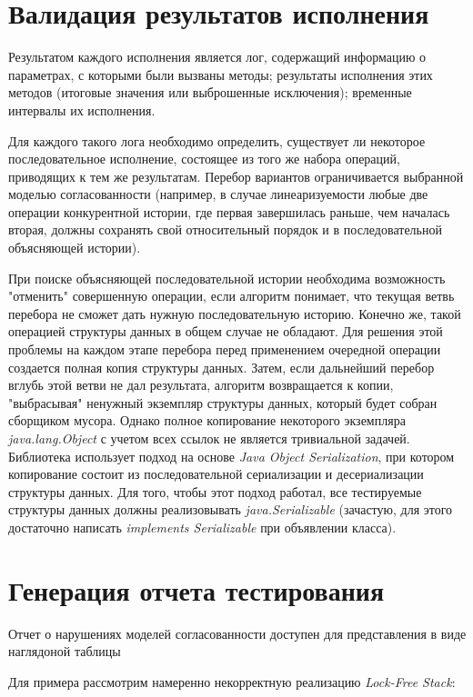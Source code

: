\documentclass[14pt, openany]{book}
\begin{document}
\section{Валидация результатов исполнения}
Результатом каждого исполнения является лог, содержащий информацию о параметрах, с которыми были вызваны методы; результаты исполнения этих методов (итоговые значения или выброшенные исключения); временные интервалы их исполнения. \par
Для каждого такого лога необходимо определить, существует ли некоторое последовательное исполнение, состоящее из того же набора операций, приводящих к тем же результатам. Перебор вариантов ограничивается выбранной моделью согласованности (например, в случае линеаризуемости любые две операции конкурентной истории, где первая завершилась раньше, чем началась вторая, должны сохранять свой относительный порядок и в последовательной объясняющей истории). \par
При поиске объясняющей последовательной истории необходима возможность "отменить" совершенную операции, если алгоритм понимает, что текущая ветвь перебора не сможет дать нужную последовательную историю. Конечно же, такой операцией структуры данных в общем случае не обладают. Для решения этой проблемы на каждом этапе перебора перед применением очередной операции создается полная копия структуры данных. Затем, если дальнейший перебор вглубь этой ветви не дал результата, алгоритм возвращается к копии, "выбрасывая" ненужный экземпляр структуры данных, который будет собран сборщиком мусора. Однако полное копирование некоторого экземпляра \textit{java.lang.Object} с учетом всех ссылок не является тривиальной задачей. Библиотека использует подход на основе \textit{Java Object Serialization}, при котором копирование состоит из последовательной сериализации и десериализации структуры данных. Для того, чтобы этот подход работал, все тестируемые структуры данных должны реализовывать \textit{java.Serializable} (зачастую, для этого достаточно написать \textit{implements Serializable} при объявлении класса).

\section{Генерация отчета тестирования}
Отчет о нарушениях моделей согласованности доступен для представления в виде наглядоной таблицы \par

Для примера рассмотрим намеренно некорректную реализацию \textit{Lock-Free Stack}:

\end{document}
